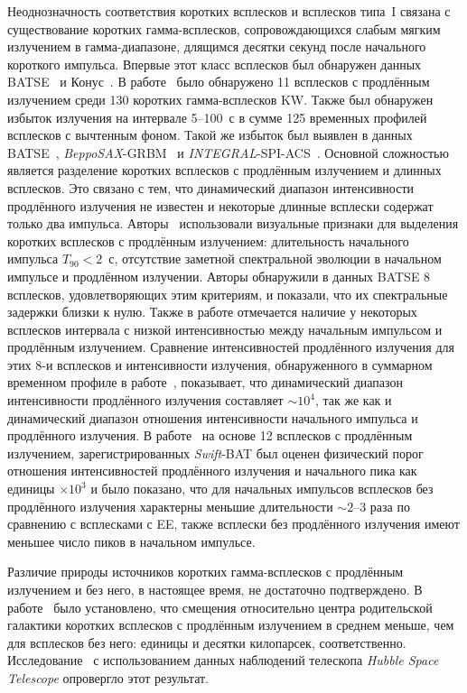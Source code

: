 Неоднозначность соответствия коротких всплесков и всплесков типа~I связана с 
существование коротких гамма-всплесков, сопровождающихся слабым мягким излучением в гамма-диапазоне, 
длящимся десятки секунд после начального короткого импульса. 
Впервые этот класс всплесков был обнаружен данных BATSE~\citep{Burenin_2000AstL} и 
Конус~\citep{Mazets_2002astro_ph}. В работе~\cite{Frederiks_2004ASPC} 
было обнаружено 11 всплесков с продлённым излучением среди 130 коротких гамма-всплесков KW. 
Также был обнаружен избыток излучения на интервале 5--100~с в сумме 125 временных 
профилей всплесков с вычтенным фоном. Такой же избыток был выявлен в данных 
BATSE~\citep{Lazzati_2001AandA, Connaughton_2002ApJ}, \textit{BeppoSAX}-GRBM~\citep{Montanari_2005ApJ} и 
\textit{INTEGRAL}-SPI-ACS~\citep{Minaev_2010AstL}. 
Основной сложностью является разделение коротких всплесков с продлённым излучением 
и длинных всплесков. Это связано с тем, что динамический диапазон интенсивности 
продлённого излучения не известен и некоторые длинные всплески содержат только 
два импульса. Авторы~\citep{Norris_and_Bonnel_2006ApJ} использовали визуальные признаки 
для выделения коротких всплесков с продлённым излучением: длительность начального 
импульса $T_{90}<2$~с, отсутствие заметной спектральной эволюции в начальном 
импульсе и продлённом излучении. Авторы обнаружили в данных BATSE 8 всплесков, 
удовлетворяющих этим критериям, и показали, что их спектральные задержки близки к нулю. 
Также в работе отмечается наличие у некоторых всплесков интервала с низкой интенсивностью 
между начальным импульсом и продлённым излучением. Сравнение интенсивностей продлённого 
излучения для этих 8-и всплесков и интенсивности излучения, обнаруженного в 
суммарном временном профиле в работе~\citep{Lazzati_2001AandA}, показывает, 
что динамический диапазон интенсивности продлённого излучения составляет $\sim 10^4$, 
так же как и динамический диапазон отношения интенсивности начального импульса и продлённого излучения.
В работе~\citep{Norris_2010ApJ} на основе 12 всплесков с продлённым излучением, зарегистрированных 
\textit{Swift}-BAT был оценен физический порог отношения интенсивностей продлённого излучения 
и начального пика как единицы $\times 10^3$ и было показано, что для начальных импульсов 
всплесков без продлённого излучения характерны меньшие длительности $\sim 2\textrm{--}3$ 
раза по сравнению с всплесками с EE, также всплески без продлённого излучения 
имеют меньшее число пиков в начальном импульсе.

Различие природы источников коротких гамма-всплесков с продлённым излучением и 
без него, в настоящее время, не достаточно подтверждено. В работе~\citep{Troja_2008MNRAS} 
было установлено, что смещения относительно центра родительской галактики 
коротких всплесков с продлённым излучением в среднем меньше, чем для всплесков без него: 
единицы и десятки килопарсек, соответственно. 
Исследование~\citep{Fong_2010ApJ} с использованием данных наблюдений 
телескопа \textit{Hubble Space Telescope} опровергло этот результат.

